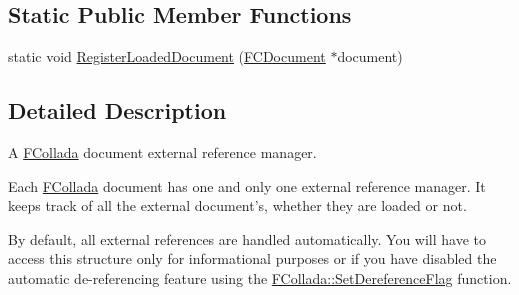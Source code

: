 \subsection*{Static Public Member Functions}
\begin{DoxyCompactItemize}
\item 
static void \hyperlink{classFCDExternalReferenceManager_a486322014ffd3a7acf3bd5aef039e05e}{RegisterLoadedDocument} (\hyperlink{classFCDocument}{FCDocument} $\ast$document)
\end{DoxyCompactItemize}


\subsection{Detailed Description}
A \hyperlink{namespaceFCollada}{FCollada} document external reference manager.

Each \hyperlink{namespaceFCollada}{FCollada} document has one and only one external reference manager. It keeps track of all the external document's, whether they are loaded or not.

By default, all external references are handled automatically. You will have to access this structure only for informational purposes or if you have disabled the automatic de-\/referencing feature using the \hyperlink{namespaceFCollada_a05ea72389195718910a74f5cd967fb47}{FCollada::SetDereferenceFlag} function. 


